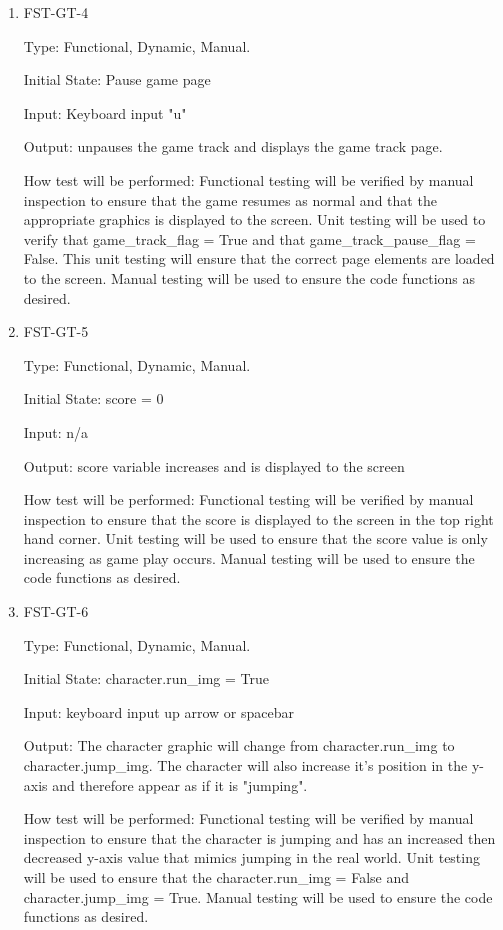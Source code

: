 \documentclass[12pt, titlepage]{article}
\begin{document}
\begin{enumerate}
		\item{FST-GT-4\\}
		
		Type: Functional, Dynamic, Manual.
		
		Initial State: Pause game page
		
		Input: Keyboard input "u"
		
		Output: unpauses the game track and displays the game track page. 
		
		How test will be performed: Functional testing will be verified by manual inspection to ensure that the game resumes as normal and that the appropriate graphics is displayed to the screen. Unit testing will be used to verify that game\_track\_flag = True and that game\_track\_pause\_flag = False. This unit testing will ensure that the correct page elements are loaded to the screen. Manual testing will be used to ensure the code functions as desired. 
		
		\item{FST-GT-5\\}
		
		Type: Functional, Dynamic, Manual.
		
		Initial State: score = 0
		
		Input: n/a
		
		Output: score variable increases and is displayed to the screen
		
		How test will be performed: Functional testing will be verified by manual inspection to ensure that the score is displayed to the screen in the top right hand corner. Unit testing will be used to ensure that the score value is only increasing as game play occurs. Manual testing will be used to ensure the code functions as desired.
		
		\item{FST-GT-6\\}
		
		Type: Functional, Dynamic, Manual.
		
		Initial State: character.run\_img = True
		
		Input: keyboard input up arrow or spacebar
		
		Output: The character graphic will change from character.run\_img to character.jump\_img. The character will also increase it's position in the y-axis and therefore appear as if it is "jumping". 
		
		How test will be performed: Functional testing will be verified by manual inspection to ensure that the character is jumping and has an increased then decreased y-axis value that mimics jumping in the real world. Unit testing will be used to ensure that the character.run\_img = False and character.jump\_img = True. Manual testing will be used to ensure the code functions as desired. 
		

\end{enumerate}
\end{document}
